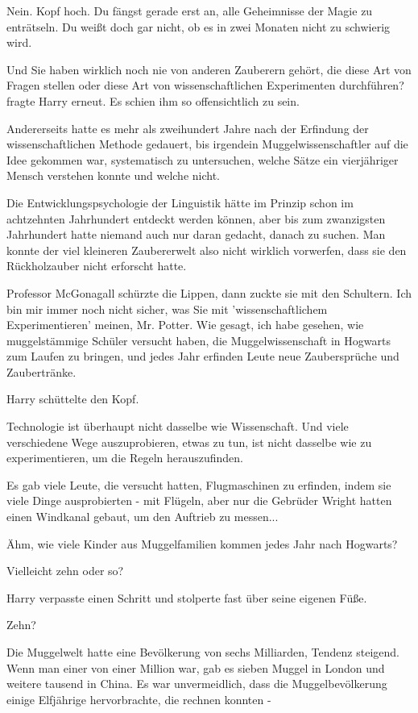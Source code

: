 Nein. Kopf hoch. Du fängst gerade erst an, alle Geheimnisse der Magie zu
enträtseln. Du weißt doch gar nicht, ob es in zwei Monaten nicht zu schwierig
wird.

\glqq{}Und Sie haben wirklich noch nie von anderen Zauberern gehört, die diese
Art von Fragen stellen oder diese Art von wissenschaftlichen Experimenten
durchführen?\grqq{} fragte Harry erneut. Es schien ihm so offensichtlich zu
sein.

Andererseits hatte es mehr als zweihundert Jahre nach der Erfindung der
wissenschaftlichen Methode gedauert, bis irgendein Muggelwissenschaftler auf die
Idee gekommen war, systematisch zu untersuchen, welche Sätze ein vierjähriger
Mensch verstehen konnte und welche nicht.

Die Entwicklungspsychologie der Linguistik hätte im Prinzip schon im achtzehnten
Jahrhundert entdeckt werden können, aber bis zum zwanzigsten Jahrhundert hatte
niemand auch nur daran gedacht, danach zu suchen. Man konnte der viel kleineren
Zaubererwelt also nicht wirklich vorwerfen, dass sie den Rückholzauber nicht
erforscht hatte.

Professor McGonagall schürzte die Lippen, dann zuckte sie mit den Schultern.
\glqq{}Ich bin mir immer noch nicht sicher, was Sie mit 'wissenschaftlichem
Experimentieren' meinen, Mr. Potter. Wie gesagt, ich habe gesehen, wie
muggelstämmige Schüler versucht haben, die Muggelwissenschaft in Hogwarts zum
Laufen zu bringen, und jedes Jahr erfinden Leute neue Zaubersprüche und
Zaubertränke.\grqq{}

Harry schüttelte den Kopf.

\glqq{}Technologie ist überhaupt nicht dasselbe wie Wissenschaft. Und viele
verschiedene Wege auszuprobieren, etwas zu tun, ist nicht dasselbe wie zu
experimentieren, um die Regeln herauszufinden.\grqq{}

Es gab viele Leute, die versucht hatten, Flugmaschinen zu erfinden, indem sie
viele Dinge ausprobierten - mit Flügeln, aber nur die Gebrüder Wright hatten
einen Windkanal gebaut, um den Auftrieb zu messen...

\glqq{}Ähm, wie viele Kinder aus Muggelfamilien kommen jedes Jahr nach
Hogwarts?\grqq{}

\glqq{}Vielleicht zehn oder so?\grqq{}

Harry verpasste einen Schritt und stolperte fast über seine eigenen Füße.

\glqq{}Zehn?\grqq{}

Die Muggelwelt hatte eine Bevölkerung von sechs Milliarden, Tendenz steigend.
Wenn man einer von einer Million war, gab es sieben Muggel in London und weitere
tausend in China. Es war unvermeidlich, dass die Muggelbevölkerung einige
Elfjährige hervorbrachte, die rechnen konnten -

